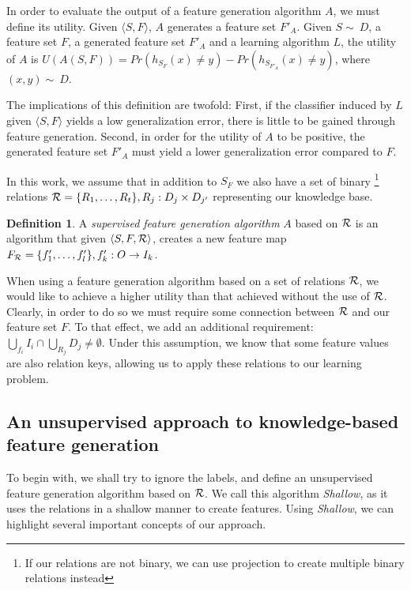\documentclass[twoside,11pt]{article}
\theoremstyle{definition}
\newtheorem{defn}{Definition}[section]
\begin{document}
In order to evaluate the output of a feature generation algorithm $A$, we must define its utility. Given $\langle S,F \rangle$, $A$ generates a feature set $F'_A$.
Given $S\sim\ D$, a feature set $F$, a generated feature set $F'_A$ and a learning algorithm $L$, the utility of $A$ is $U(A(S,F))=Pr(h_{S_F}(x)\neq y)-Pr(h_{S_{F'_A}}(x)\neq y)$, where $(x,y)\sim\ D$.

The implications of this definition are twofold: First, if the classifier induced by $L$ given  $\langle S,F \rangle$ yields a low generalization error, there is little to be gained through feature generation. Second, in order for the utility of $A$ to be positive, the generated feature set $F'_A$ must yield a lower generalization error compared to $F$.

In this work, we assume that in addition to $S_F$ we also have a set of binary \footnote{If our relations are not binary, we can use projection to create multiple binary relations instead} relations ${\cal R}=\{R_{1},\ldots,R_{t}\}, R_j:D_j\times D_{j'}$ representing our knowledge base. 
\begin{defn}
	A \emph{supervised feature generation algorithm} $A$ based on ${\cal R}$ is an algorithm that given $\langle S,F,{\cal R} \rangle$, creates a new feature map $F_{{\cal R}}=\{f'_{1},\ldots,f'_{l}\}, f'_{k}:O\rightarrow I_k$.
\end{defn}

When using a feature generation algorithm based on a set of relations ${\cal R}$, we would like to achieve a higher utility than that achieved without the use of ${\cal R}$. Clearly, in order to do so we must require some connection between ${\cal R}$ and our feature set $F$. To that effect, we add an additional requirement:  $\bigcup_{f_i} I_i \cap \bigcup_{R_j} D_j \neq \emptyset$. Under this assumption, we know that some feature values are also relation keys, allowing us to apply these relations to our learning problem.

\subsection{An unsupervised approach to knowledge-based feature generation} \label{shallow_section}

To begin with, we shall try to ignore the labels, and define an unsupervised feature generation algorithm based on ${\cal R}$. We call this algorithm \emph{Shallow}, as it uses the relations in a shallow manner to create features. Using \emph{Shallow}, we can highlight several important concepts of our approach.
\end{document}
